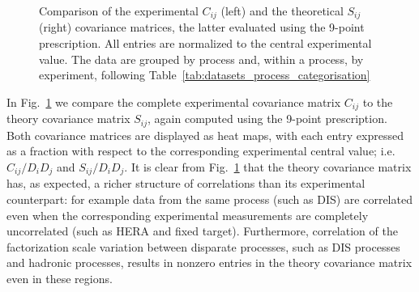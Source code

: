 \begin{figure}[t!]
\begin{center}
    \caption{\small Comparison of the  experimental $C_{ij}$ (left)
      and the theoretical  $S_{ij}$  
      (right) covariance matrices, the latter evaluated using the 9-point
      prescription.
      All entries are normalized to the central  experimental value.
  The data are grouped by process and, within a process, by experiment, following
  Table~\ref{tab:datasets_process_categorisation} 
        \label{fig:covmats} }
  \end{center}
\end{figure}

In Fig.~\ref{fig:covmats} we compare the 
complete experimental covariance matrix $C_{ij}$ to the theory covariance
matrix $S_{ij}$, again computed using the 9-point prescription. Both covariance matrices are displayed
as heat maps, with each entry expressed as a fraction with respect to the
corresponding experimental central value; i.e. $C_{ij}/D_iD_j$ and
$S_{ij}/D_iD_j$. It is clear from Fig.~\ref{fig:covmats} that
the theory covariance matrix has, as expected, a 
richer structure of correlations than
its experimental counterpart: for example data from the same
process (such as DIS) are correlated even when the corresponding
experimental measurements are completely uncorrelated (such as HERA and
fixed target). Furthermore, correlation of the factorization scale variation 
between disparate processes, such as DIS processes and hadronic processes, 
results in nonzero entries in the theory covariance matrix even  
in these regions.
